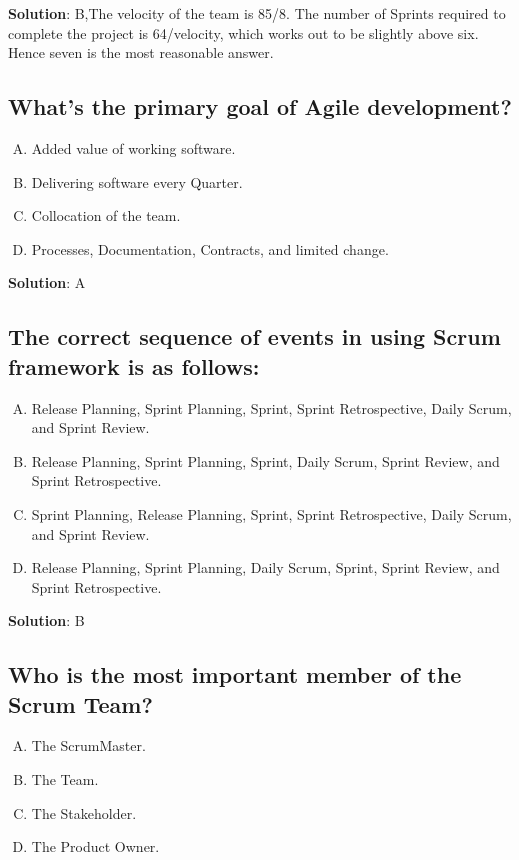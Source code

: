 \textbf{Solution}: B,The velocity of the team is 85/8. The number of Sprints required to
complete the project is 64/velocity, which works out to be slightly above six. Hence
seven is the most reasonable answer.


\subsection{What's the primary goal of Agile development?}
\begin{enumerate}[A)]
  \item Added value of working software.
  \item Delivering software every Quarter.
  \item Collocation of the team.
  \item Processes, Documentation, Contracts, and limited change.
\end{enumerate}


\textbf{Solution}: A


\subsection{The correct sequence of events in using Scrum framework is as follows:}
\begin{enumerate}[A)]
  \item Release Planning, Sprint Planning, Sprint, Sprint Retrospective, Daily Scrum, and Sprint Review.
  \item Release Planning, Sprint Planning, Sprint, Daily Scrum, Sprint Review, and Sprint Retrospective.
  \item Sprint Planning, Release Planning, Sprint, Sprint Retrospective, Daily Scrum, and Sprint Review.
  \item Release Planning, Sprint Planning, Daily Scrum, Sprint, Sprint Review, and Sprint Retrospective.
\end{enumerate}


\textbf{Solution}: B


\subsection{Who is the most important member of the Scrum Team? }
\begin{enumerate}[A)]
  \item The ScrumMaster.
  \item The Team.
  \item The Stakeholder.
  \item The Product Owner.
\end{enumerate}


